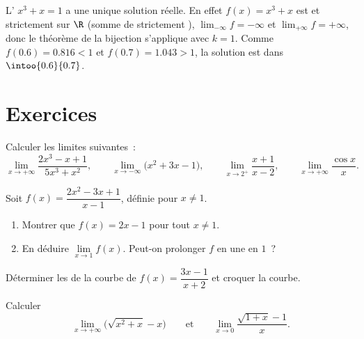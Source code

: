 \begin{example}\label{ex:g12:limcont:cubic}
L' $x^3 + x = 1$ a une unique solution réelle. En effet
$f(x) = x^3 + x$ est  et strictement  sur $\R$ (somme de
 strictement ), $\lim_{-\infty} f = -\infty$ et
$\lim_{+\infty} f = +\infty$, donc le théorème de la bijection s'applique
avec $k = 1$. Comme $f(0.6) = 0.816 < 1$ et $f(0.7) = 1.043 > 1$, la
solution est dans $\intoo{0.6}{0.7}$.
\end{example}

\section{Exercices}

\begin{exercise}[$\star$]\label{exo:g12:limcont:1}
Calculer les limites suivantes~:
\[
\lim_{x\to+\infty} \frac{2x^3 - x + 1}{5x^3 + x^2}, \qquad
\lim_{x\to-\infty} \bigl(x^2 + 3x - 1\bigr), \qquad
\lim_{x\to 2^+} \frac{x+1}{x-2}, \qquad
\lim_{x\to+\infty} \frac{\cos x}{x}.
\]
\end{exercise}

\begin{exercise}[$\star$]\label{exo:g12:limcont:2}
Soit $f(x) = \dfrac{2x^2 - 3x + 1}{x - 1}$, définie pour $x \neq 1$.
\begin{enumerate}
  \item Montrer que $f(x) = 2x - 1$ pour tout $x \neq 1$.
  \item En déduire $\lim\limits_{x \to 1} f(x)$. Peut-on prolonger $f$ en
        une   en $1$~?
\end{enumerate}
\end{exercise}

\begin{exercise}[$\star$]\label{exo:g12:limcont:3}
Déterminer les  de la courbe de
$f(x) = \dfrac{3x - 1}{x + 2}$ et croquer la courbe.
\end{exercise}

\begin{exercise}[$\star\star$]\label{exo:g12:limcont:4}
Calculer
\[
\lim_{x\to+\infty} \bigl(\sqrt{x^2 + x} - x\bigr)
\qquad\text{et}\qquad
\lim_{x\to 0} \frac{\sqrt{1+x} - 1}{x}.
\]
\end{exercise}

